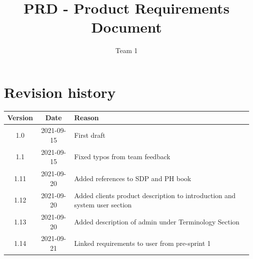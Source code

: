 \documentclass{article}
\title{PRD - Product Requirements Document}
\author{Team 1}
\begin{document}
\date{}
\maketitle
\thispagestyle{fancy}
\newpage

\tableofcontents

\section*{Revision history}
\begin{tabular}{ |c|c|l| } 
 \hline
 Version & Date & Reason \\ \hline
 1.0 & 2021-09-15 & First draft \\ 
 1.1 & 2021-09-15 & Fixed typos from team feedback \\ 
 1.11 & 2021-09-20 & Added references to SDP and PH book\\
 1.12 & 2021-09-20 & Added clients product description to introduction and system user section \\
 1.13 & 2021-09-20 & Added description of admin under Terminology Section\\
 1.14 & 2021-09-21 & Linked requirements to user from pre-sprint 1\\
 \hline
\end{tabular}

\newpage
\end{document}
